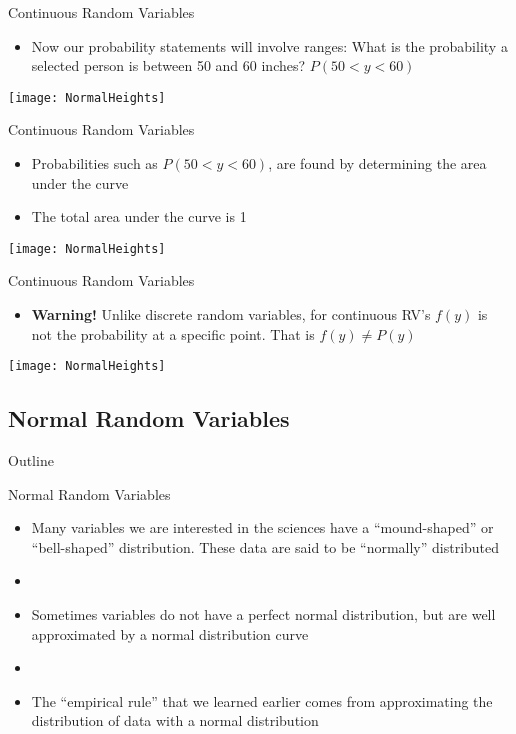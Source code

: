 \documentclass[xcolor=dvipsnames]{beamer}
\begin{document}
\begin{frame}{Continuous Random Variables}
	\begin{itemize}
		\item Now our probability statements will involve ranges: What is the probability a selected person is between 50 and 60 inches? $P(50 < y < 60)$
	\end{itemize}
\begin{center}
	\texttt{[image: NormalHeights]}
\end{center}
\end{frame}

\begin{frame}{Continuous Random Variables}
	\begin{itemize}
		\item Probabilities such as $P(50 < y < 60)$, are found by determining the area under the curve
		\item The total area under the curve is 1
	\end{itemize}
	\begin{center}
		\texttt{[image: NormalHeights]}
	\end{center}
\end{frame}

\begin{frame}{Continuous Random Variables}
	\begin{itemize}
		\item \textbf{Warning!} Unlike discrete random variables, for continuous RV's $f(y)$ is not the probability at a specific point. That is $f(y) \neq P(y)$ 
	\end{itemize}
	\begin{center}
		\texttt{[image: NormalHeights]}
	\end{center}
\end{frame}

\subsection{Normal Random Variables}
\begin{frame}{Outline}
	\tableofcontents[currentsection,subsectionstyle=show/shaded/hide]
\end{frame}

\begin{frame}{Normal Random Variables}
	\begin{itemize}
		\item Many variables we are interested in the sciences have a ``mound-shaped'' or ``bell-shaped'' distribution. These data are said to be ``normally'' distributed
		\item[]
		\item Sometimes variables do not have a perfect normal distribution, but are well approximated by a normal distribution curve
		\item[]
		\item The ``empirical rule'' that we learned earlier comes from approximating the distribution of data with a normal distribution
	\end{itemize}
\end{frame}
\end{document}
